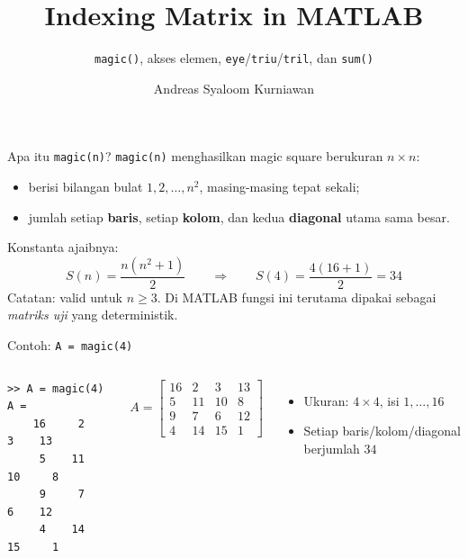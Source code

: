 \documentclass[aspectratio=169,11pt]{beamer}
\title{Indexing Matrix in MATLAB}
\subtitle{\texttt{magic()}, akses elemen, \texttt{eye}/\texttt{triu}/\texttt{tril}, dan \texttt{sum()}}
\author{Andreas Syaloom Kurniawan}
\institute{Faculty of Economics and Business, Universitas Gadjah Mada}
\date{}
\begin{document}
\maketitle

\begin{frame}{Apa itu \texttt{magic(n)}?}
\texttt{magic(n)} menghasilkan \alert{magic square} berukuran $n\times n$:
\begin{itemize}
  \item berisi bilangan bulat $1, 2, \dots, n^2$, masing-masing tepat sekali;
  \item jumlah setiap \textbf{baris}, setiap \textbf{kolom}, dan kedua
        \textbf{diagonal} utama sama besar.
\end{itemize}
\vspace{0.5em}
Konstanta ajaibnya:
\[
  S(n) = \frac{n(n^2+1)}{2}
  \qquad\Longrightarrow\qquad
  S(4) = \frac{4(16+1)}{2} = 34
\]
\vspace{0.3em}
\small Catatan: valid untuk $n\ge 3$. Di MATLAB fungsi ini terutama dipakai
sebagai \emph{matriks uji} yang deterministik.
\end{frame}

\begin{frame}[fragile]{Contoh: \texttt{A = magic(4)}}
\begin{columns}[T]
\begin{lstlisting}
>> A = magic(4)
A =
    16     2     3    13
     5    11    10     8
     9     7     6    12
     4    14    15     1
\end{lstlisting}
\[
A=\begin{bmatrix}
16 & 2 & 3 & 13\\
5 & 11 & 10 & 8\\
9 & 7 & 6 & 12\\
4 & 14 & 15 & 1
\end{bmatrix}
\]
\begin{itemize}\small
  \item Ukuran: $4\times 4$, isi $1,\dots,16$
  \item Setiap baris/kolom/diagonal berjumlah $34$
\end{itemize}
\end{columns}
\end{frame}
\end{document}
